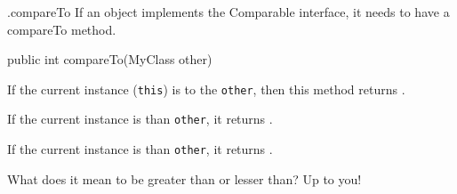 \documentclass[week4]{csse2002}
\begin{document}
\begin{topic}{.compareTo}
If an object implements the Comparable interface, it needs to have a
compareTo method.

\begin{java}
public int compareTo(MyClass other)
\end{java}

If the current instance (\texttt{this}) is  to the \texttt{other}, then this method returns .

If the current instance is  than \texttt{other}, it returns .

If the current instance is  than \texttt{other}, it returns .

What does it mean to be greater than or lesser than? Up to you!
\end{topic}
\end{document}

